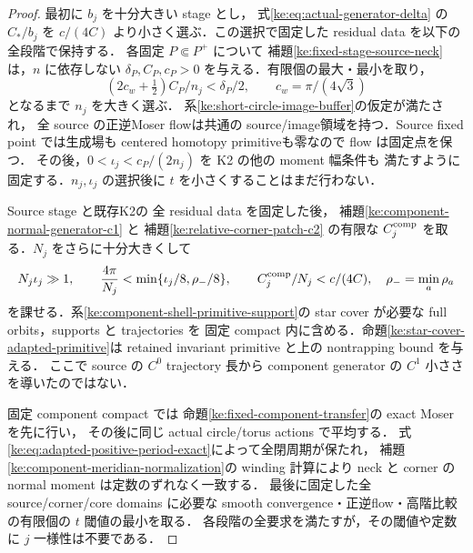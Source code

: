 \begin{proof}
最初に $b_j$ を十分大きい stage とし，
式\eqref{ke:eq:actual-generator-delta} の $C_*/b_j$ を
$c/(4C)$ より小さく選ぶ．この選択で固定した residual
data を以下の全段階で保持する．
各固定 $P\Subset P^+$ について
補題\ref{ke:fixed-stage-source-neck}は，$n$ に依存しない
$\delta_P,C_P,c_P>0$ を与える．有限個の最大・最小を取り，
\[
 (2c_w+\tfrac12)C_P/n_j<\delta_P/2,\qquad
 c_w=\pi/(4\sqrt3)
\]
となるまで $n_j$ を大きく選ぶ．
系\ref{ke:short-circle-image-buffer}の仮定が満たされ，
全 source の正逆Moser flowは共通の
source/image領域を持つ．Source fixed point では生成場も
centered homotopy primitiveも零なので flow は固定点を保つ．
その後，$0<\iota_j<c_P/(2n_j)$ を K2 の他の moment 幅条件も
満たすように固定する．$n_j,\iota_j$ の選択後に
$t$ を小さくすることはまだ行わない．

Source stage と既存K2の
全 residual data を固定した後，
補題\ref{ke:component-normal-generator-c1} と
補題\ref{ke:relative-corner-patch-c2} の有限な
$C_j^{\rm comp}$ を取る．$N_j$ をさらに十分大きくして
\[
 N_j\iota_j\gg1,\qquad
 \frac{4\pi}{N_j}<\min\{\iota_j/8,\rho_-/8\},\qquad
 C_j^{\rm comp}/N_j<c/(4C),\quad \rho_-=\min_a\rho_a
\]
を課せる．系\ref{ke:component-shell-primitive-support}の
star cover が必要な full orbits，supports と trajectories を
固定 compact 内に含める．命題\ref{ke:star-cover-adapted-primitive}は
retained invariant primitive と上の nontrapping bound を与える．
ここで source の $C^0$ trajectory 長から component generator の
$C^1$ 小ささを導いたのではない．

固定 component compact では
命題\ref{ke:fixed-component-transfer}の exact Moser を先に行い，
その後に同じ actual circle/torus actions で平均する．
式\eqref{ke:eq:adapted-positive-period-exact}によって全閉周期が保たれ，
補題\ref{ke:component-meridian-normalization}の winding 計算により
neck と corner の normal moment は定数のずれなく一致する．
最後に固定した全 source/corner/core domains に必要な smooth
convergence・正逆flow・高階比較の有限個の $t$ 閾値の最小を取る．
各段階の全要求を満たすが，その閾値や定数に $j$ 一様性は不要である．
\end{proof}

